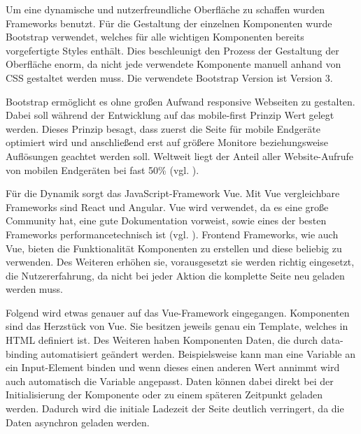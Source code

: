 Um eine dynamische und nutzerfreundliche Oberfläche zu schaffen wurden Frameworks benutzt. 
Für die Gestaltung der einzelnen Komponenten wurde Bootstrap verwendet, welches für alle wichtigen Komponenten bereits vorgefertigte Styles enthält.
Dies beschleunigt den Prozess der Gestaltung der Oberfläche enorm, da nicht jede verwendete Komponente manuell anhand von \ac{CSS} gestaltet werden muss. 
Die verwendete Bootstrap Version ist Version 3.

Bootstrap ermöglicht es ohne großen Aufwand responsive Webseiten zu gestalten. 
Dabei soll während der Entwicklung auf das mobile-first Prinzip Wert gelegt werden. 
Dieses Prinzip besagt, dass zuerst die Seite für mobile Endgeräte optimiert wird und anschließend erst auf größere Monitore beziehungsweise Auflösungen geachtet werden soll. 
Weltweit liegt der Anteil aller Website-Aufrufe von mobilen Endgeräten bei fast 50\% (vgl. \cite{.stat-mobile}). 

Für die Dynamik sorgt das JavaScript-Framework Vue. Mit Vue vergleichbare Frameworks sind React und Angular. Vue wird verwendet, da es eine große Community hat, eine gute Dokumentation vorweist, sowie eines der besten Frameworks performancetechnisch ist (vgl. \cite{.vue-react-angular}).
Frontend Frameworks, wie auch Vue, bieten die Funktionalität Komponenten zu erstellen und diese beliebig zu verwenden. 
Des Weiteren erhöhen sie, vorausgesetzt sie werden richtig eingesetzt, die Nutzererfahrung, da nicht bei jeder Aktion die komplette Seite neu geladen werden muss.

Folgend wird etwas genauer auf das Vue-Framework eingegangen. 
Komponenten sind das Herzstück von Vue. Sie besitzen jeweils genau ein Template, welches in \ac{HTML} definiert ist. 
Des Weiteren haben Komponenten Daten, die durch data-binding automatisiert geändert werden. 
Beispielsweise kann man eine Variable an ein Input-Element binden und wenn dieses einen anderen Wert annimmt wird auch automatisch die Variable angepasst. 
Daten können dabei direkt bei der Initialisierung der Komponente oder zu einem späteren Zeitpunkt geladen werden.
Dadurch wird die initiale Ladezeit der Seite deutlich verringert, da die Daten asynchron geladen werden.

